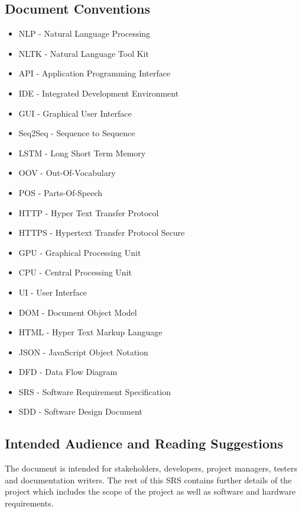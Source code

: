 \documentclass[11pt]{report}
\begin{document}
 \subsection{Document Conventions}
 \begin{itemize}
\item NLP - Natural Language Processing
\item NLTK - Natural Language Tool Kit
\item API - Application Programming Interface
\item IDE - Integrated Development Environment 
\item GUI - Graphical User Interface
\item Seq2Seq - Sequence to Sequence
\item LSTM - Long Short Term Memory
\item OOV - Out-Of-Vocabulary
\item POS - Parts-Of-Speech
\item HTTP - Hyper Text Transfer Protocol
\item HTTPS - Hypertext Transfer Protocol Secure
\item GPU - Graphical Processing Unit
\item CPU - Central Processing Unit
\item UI - User Interface
\item DOM - Document Object Model
\item HTML - Hyper Text Markup Language 
\item JSON - JavaScript Object Notation
\item DFD - Data Flow Diagram
\item SRS - Software Requirement Specification
\item SDD - Software Design Document


\end{itemize}

 \subsection{Intended Audience and Reading Suggestions}  
 The document is intended for stakeholders, developers, project managers, testers and documentation writers. The rest of this SRS contains further details of the project which includes the scope of the project as well as software and hardware requirements.
 
\end{document}

